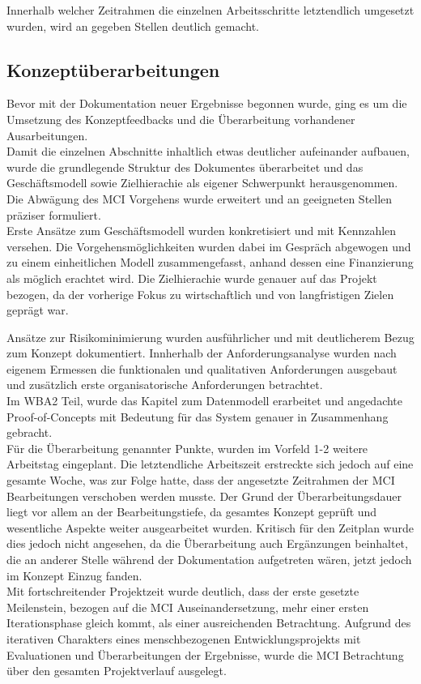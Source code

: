 Innerhalb welcher Zeitrahmen die einzelnen Arbeitsschritte letztendlich umgesetzt wurden, wird an gegeben Stellen deutlich gemacht.\\

\subsection{Konzeptüberarbeitungen}
Bevor mit der Dokumentation neuer Ergebnisse begonnen wurde, ging es um die Umsetzung des Konzeptfeedbacks und die Überarbeitung vorhandener Ausarbeitungen.\\
Damit die einzelnen Abschnitte inhaltlich etwas deutlicher aufeinander aufbauen, wurde die grundlegende Struktur des Dokumentes überarbeitet und das Geschäftsmodell sowie Zielhierachie als eigener Schwerpunkt herausgenommen. Die Abwägung des MCI Vorgehens wurde erweitert und an geeigneten Stellen präziser formuliert.\\

Erste Ansätze zum Geschäftsmodell wurden konkretisiert und mit Kennzahlen versehen. Die Vorgehensmöglichkeiten wurden dabei im Gespräch abgewogen und zu einem einheitlichen Modell zusammengefasst, anhand dessen eine Finanzierung als möglich erachtet wird. Die Zielhierachie wurde genauer auf das Projekt bezogen, da der vorherige Fokus zu wirtschaftlich und von langfristigen Zielen geprägt war.

\newpage
Ansätze zur Risikominimierung wurden ausführlicher und mit deutlicherem Bezug zum Konzept dokumentiert. Innherhalb der Anforderungsanalyse wurden nach eigenem Ermessen die funktionalen und qualitativen Anforderungen ausgebaut und zusätzlich erste organisatorische Anforderungen betrachtet.\\
Im WBA2 Teil, wurde das Kapitel zum Datenmodell erarbeitet und angedachte Proof-of-Concepts mit Bedeutung für das System genauer in Zusammenhang gebracht.\\

Für die Überarbeitung genannter Punkte, wurden im Vorfeld 1-2 weitere Arbeitstag eingeplant. Die letztendliche Arbeitszeit erstreckte sich jedoch auf eine gesamte Woche, was zur Folge hatte, dass der angesetzte Zeitrahmen der MCI Bearbeitungen verschoben werden musste. Der Grund der Überarbeitungsdauer liegt vor allem an der Bearbeitungstiefe, da gesamtes Konzept geprüft und wesentliche Aspekte weiter ausgearbeitet wurden. Kritisch für den Zeitplan wurde dies jedoch nicht angesehen, da die Überarbeitung auch Ergänzungen beinhaltet, die an anderer Stelle während der Dokumentation aufgetreten wären, jetzt jedoch im Konzept Einzug fanden.\\ Mit fortschreitender Projektzeit wurde deutlich, dass der erste gesetzte Meilenstein, bezogen auf die MCI Auseinandersetzung, mehr einer ersten Iterationsphase gleich kommt, als einer ausreichenden Betrachtung. Aufgrund des iterativen Charakters eines menschbezogenen Entwicklungsprojekts mit Evaluationen und Überarbeitungen der Ergebnisse, wurde die MCI Betrachtung über den gesamten Projektverlauf ausgelegt.

